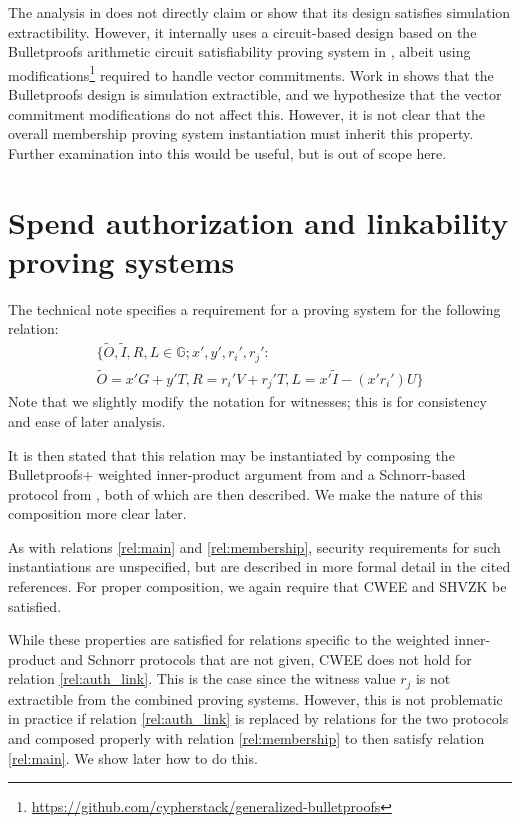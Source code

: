 \documentclass{article}
\theoremstyle{definition}
\newcommand{\GG}{\mathbb{G}}
\newcommand{\wt}[1]{\widetilde{#1}}
\begin{document}
The analysis in \cite{curve_trees} does not directly claim or show that its design satisfies simulation extractibility.
However, it internally uses a circuit-based design based on the Bulletproofs arithmetic circuit satisfiability proving system in \cite{bp}, albeit using modifications\footnote{\url{https://github.com/cypherstack/generalized-bulletproofs}} required to handle vector commitments.
Work in \cite{bp_agm, bp_rom,bp_spartan_simext} shows that the Bulletproofs design is simulation extractible, and we hypothesize that the vector commitment modifications do not affect this.
However, it is not clear that the overall membership proving system instantiation must inherit this property.
Further examination into this would be useful, but is out of scope here.


\section{Spend authorization and linkability proving systems}

The technical note specifies a requirement for a proving system for the following relation:
\begin{multline}
	\label{rel:auth_link}
	\Big\{ \wt{O}, \wt{I}, R, L \in \GG ; x', y', r_i', r_j' : \\
	\wt{O} = x' G + y' T, R = r_i' V + r_j' T, L = x' \wt{I} - (x' r_i') U \Big\}
\end{multline}
Note that we slightly modify the notation for witnesses; this is for consistency and ease of later analysis.

It is then stated that this relation may be instantiated by composing the Bulletproofs+ weighted inner-product argument from \cite{bpp} and a Schnorr-based protocol from \cite{schnorr}, both of which are then described.
We make the nature of this composition more clear later.

As with relations \ref{rel:main} and \ref{rel:membership}, security requirements for such instantiations are unspecified, but are described in more formal detail in the cited references.
For proper composition, we again require that CWEE and SHVZK be satisfied.

While these properties are satisfied for relations specific to the weighted inner-product and Schnorr protocols that are not given, CWEE does not hold for relation \ref{rel:auth_link}.
This is the case since the witness value $r_j$ is not extractible from the combined proving systems.
However, this is not problematic in practice if relation \ref{rel:auth_link} is replaced by relations for the two protocols and composed properly with relation \ref{rel:membership} to then satisfy relation \ref{rel:main}.
We show later how to do this.
\end{document}
